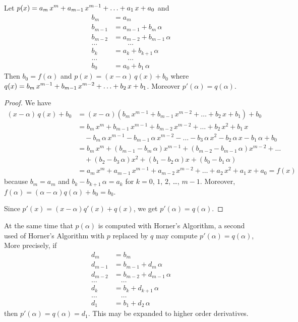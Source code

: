 \begin{theorem}[Horner]
Let
$\displaystyle p(x) = a_m\,x^m + a_{m-1}\,x^{m-1} + \ldots + a_1\,x + a_0$ and
\[
\begin{split}
b_m &= a_m \\
b_{m-1} &= a_{m-1} + b_m \, \alpha \\
b_{m-2} &= a_{m-2} + b_{m-1} \, \alpha \\
\ldots & \qquad \ldots \\
b_k &= a_k + b_{k+1} \, \alpha \\
\ldots & \qquad \ldots \\
b_0 &= a_0 + b_1 \, \alpha
\end{split}
\]
Then  $b_0 = f(\alpha)$ and $p(x) = (x - \alpha)\,q(x) + b_0$ where
$\displaystyle q(x) = b_m\,x^{m-1} + b_{m-1}\,x^{m-2} + \ldots + b_2\,x + b_1$.
Moreover $p'(\alpha) = q(\alpha)$.
\label{HornerTh}
\end{theorem}

\begin{proof}
We have
\begin{align*}
(x-\alpha)\,q(x) + b_0 &= (x-\alpha)(b_m\,x^{m-1} + b_{m-1}\,x^{m-2} +
\ldots + b_2\,x + b_1) + b_0\\
&= b_m\,x^m + b_{m-1}\,x^{m-1} + b_{m-2}\,x^{m-2} + \ldots + b_2\,x^2
+ b_1\,x \\
& \quad - b_m\,\alpha\,x^{m-1} - b_{m-1}\,\alpha\,x^{m-2} - \ldots -
b_3\,\alpha\,x^2 - b_2\,\alpha\,x - b_1\,\alpha + b_0\\
&= b_m\,x^m + (b_{m-1} -b_m\,\alpha)x^{m-1} + (b_{m-2}
-b_{m-1}\,\alpha)x^{m-2} + \ldots \\
& \quad + (b_2 - b_3\,\alpha)x^2 + (b_1 - b_2\,\alpha)x +
(b_0 - b_1\,\alpha)\\
&= a_m\,x^m + a_{m-1}\,x^{m-1} + a_{m-2}\,x^{m-2} + \ldots + a_2\,x^2
+ a_1\,x + a_0
= f(x)
\end{align*}
because $b_m = a_m$ and $b_k - b_{k+1}\,\alpha = a_k$ for
$k = 0$, $1$, $2$, \ldots, $m-1$.  Moreover,
$f(\alpha) = (\alpha -\alpha)q(\alpha) + b_0 = b_0$.

Since $p'(x) = (x-\alpha)q'(x) + q(x)$, we get $p'(\alpha) = q(\alpha)$.
\end{proof}

At the same time that $p(\alpha)$ is computed with Horner's Algorithm, a
second used of Horner's Algorithm with $p$ replaced by $q$ may compute
$p'(\alpha) = q(\alpha)$,  More precisely, if
\[
\begin{split}
d_m &= b_m \\
d_{m-1} &= b_{m-1} + d_m \, \alpha \\
d_{m-2} &= b_{m-2} + d_{m-1} \, \alpha \\
\ldots & \quad \ldots \\
d_k &= b_k + d_{k+1} \, \alpha \\
\ldots & \quad \ldots \\
d_1 &= b_1 + d_2 \, \alpha
\end{split}
\]
then $p'(\alpha) = q(\alpha) = d_1$.  This may be expanded to higher
order derivatives.

